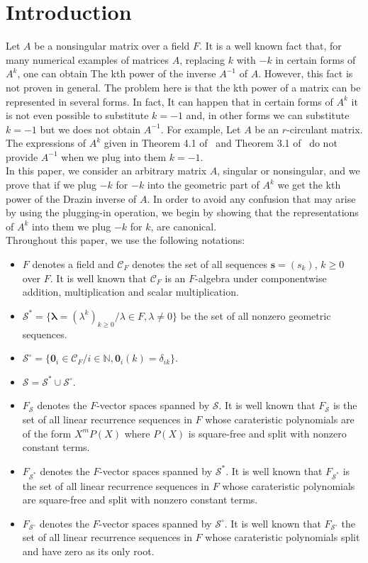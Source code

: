 \documentclass[12pt]{amsart}
\theoremstyle{definition}
\numberwithin{equation}{section}
\numberwithin{equation}{section}
\begin{document}
\section{Introduction}
\label{sec1}
Let $A$ be a nonsingular matrix over a field $F$. It is a well known fact that, for many numerical examples of matrices $A$, replacing $k$ with $-k$ in certain forms of $A^{k}$, one can obtain The kth power of the inverse $A^{-1}$ of $A$. However, this fact is not proven in general. The problem here is that the kth power of a matrix can be represented in several forms. In fact, It can happen that in certain forms of $A^{k}$ it is not even possible to substitute $k=-1$ and, in other forms we can substitute $k=-1$ but we does not obtain $A^{-1}$. For example, Let $A$ be an $r$-circulant matrix. The expressions of $A^{k}$ given in Theorem 4.1 of~\cite{Mou1} and Theorem 3.1 of~\cite{Mou2} do not provide $A^{-1}$ when we plug into them $k=-1$.
\\In this paper, we consider an arbitrary matrix $A$, singular or nonsingular, and we prove that if we plug $-k$ for $-k$ into the geometric part of $A^{k}$ we get the kth power of the Drazin inverse of $A$. In order to avoid any confusion that may arise by using the plugging-in operation, we begin by showing that the representations of $A^{k}$ into them we plug $-k$ for $k$, are canonical.
\\Throughout this paper, we use the following notations:
\begin{itemize}
\item $F$ denotes a field and $\mathcal{C}_{F}$ denotes the set of all sequences $\pmb{s}=(s_{k})$, $k\geqslant 0$ over $F$. It is well known that $\mathcal{C}_{F}$ is an $F$-algebra under componentwise addition, multiplication and scalar multiplication.
\item $\mathcal{S}^{\ast}=\{\pmb{\lambda}=(\lambda^{k})_{k\geqslant 0}/\lambda\in F, \lambda\neq 0\}$ be the set of all nonzero geometric sequences.
\item $\mathcal{S}^{\circ}=\{\pmb{0}_{i}\in \mathcal{C}_{F}/i\in \mathbb{N}, \pmb{0}_{i}(k)=\delta_{ik}\}$.
\item $\mathcal{S}=\mathcal{S}^{\ast}\cup \mathcal{S}^{\circ}$.
\item $F_{\mathcal{S}}$ denotes the $F$-vector spaces spanned by $\mathcal{S}$. It is well known that $F_{\mathcal{S}}$ is the set of all linear recurrence sequences in $F$ whose carateristic polynomials are of the form $X^{m}P(X)$ where $P(X)$ is square-free and split with nonzero constant terms.
\item $F_{\mathcal{S}^{\ast}}$ denotes the $F$-vector spaces spanned by $\mathcal{S}^{\ast}$. It is well known that $F_{\mathcal{S}^{\ast}}$ is the set of all linear recurrence sequences in $F$ whose carateristic polynomials are square-free and split with nonzero constant terms.
\item $F_{\mathcal{S}^{\circ}}$ denotes the $F$-vector spaces spanned by $\mathcal{S}^{\circ}$. It is well known that $F_{\mathcal{S}^{\circ}}$ the set of all linear recurrence sequences in $F$ whose carateristic polynomials split and have zero as its only root.
\end{itemize}
\end{document}

